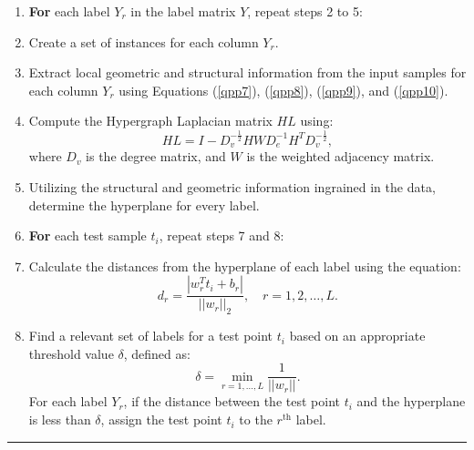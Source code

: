 \documentclass[12pt,a4paper,oneside,english]{report}
\begin{document}
\begin{enumerate}
    \item \textbf{For} each label $Y_r$ in the label matrix $Y$, repeat steps 2 to 5:

        \item Create a set of instances for each column $Y_r$.
        \item Extract local geometric and structural information from the input samples for each column $Y_r$ using Equations (\ref{qpp7}), (\ref{qpp8}), (\ref{qpp9}), and (\ref{qpp10}).
        \item Compute the Hypergraph Laplacian matrix $HL$ using:
        \[
        HL = I - D_v^{-\frac{1}{2}}HWD_e^{-1}H^T D_v^{-\frac{1}{2}},
        \]
        where $D_v$ is the degree matrix, and $W$ is the weighted adjacency matrix.
        \item Utilizing the structural and geometric information ingrained in the data, determine the hyperplane for every label.
    \item \textbf{For} each test sample $t_i$, repeat steps 7 and 8:
        \item Calculate the distances from the hyperplane of each label using the equation:
        \[
        d_r = \frac{|w_r^T t_i + b_r|}{||w_r||_2}, \quad r = 1, 2, \ldots, L.
        \]
        \item Find a relevant set of labels for a test point $t_i$ based on an appropriate threshold value $\delta$, defined as:
        \[
        \delta = \min_{r = 1, \ldots, L} \frac{1}{||w_r||}.
        \]
        For each label $Y_r$, if the distance between the test point $t_i$ and the hyperplane is less than $\delta$, assign the test point $t_i$ to the $r^{\text{th}}$ label.
\end{enumerate}
\hrule
\end{document}
